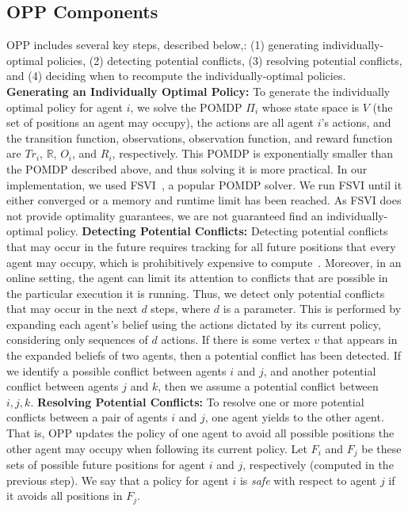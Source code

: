 \documentclass[letterpaper]{article} %
\begin{document}
\subsection{OPP Components}
OPP includes several key steps, described below,:
(1) generating individually-optimal policies,
(2) detecting potential conflicts,
(3) resolving potential conflicts,
and (4) deciding when to recompute the individually-optimal policies.
\noindent\textbf{Generating an Individually Optimal Policy:}
To generate the individually optimal policy for agent $i$, we solve
the POMDP $\Pi_i$ whose state space is $V$ (the set of positions an agent may occupy), the actions are all agent $i$'s actions,
and the transition function, observations, observation function, and reward function are $Tr_i$, $\mathbb{R}$, $O_i$, and $R_i$, respectively.
This POMDP is exponentially smaller than the POMDP described above, and thus solving it is more practical.
In our implementation, we used FSVI~\cite{shani2007forward}, a popular POMDP solver.
We run FSVI until it either converged or a memory and runtime limit has been reached.
As FSVI does not provide optimality guarantees, we are not guaranteed find an individually-optimal policy.
\noindent\textbf{Detecting Potential Conflicts:}
Detecting potential conflicts that may occur in the future requires tracking for all future positions that every agent may occupy, which is prohibitively expensive to compute~\cite{atzmon2020probabilistic}. Moreover, in an online setting, the agent can limit its attention to conflicts that are possible in the particular execution it is running.
Thus, we detect only potential conflicts that may occur in the next $d$ steps, where $d$ is a parameter.
This is performed by expanding each agent's belief using the actions dictated by its current policy, considering only sequences of $d$ actions.
If there is some vertex $v$ that appears in the expanded beliefs of two agents, then a potential conflict has been detected.
If we identify a possible conflict between agents $i$ and $j$, and another potential conflict between agents $j$ and $k$, then we assume a potential conflict between $i,j,k$.
\noindent\textbf{Resolving Potential Conflicts:}
To resolve one or more potential conflicts between a pair of agents $i$ and $j$, one agent yields to the other agent.
That is, OPP updates the policy of one agent to avoid all possible positions the other agent  may occupy when following its current policy.
Let $F_i$ and $F_j$ be these sets of possible future positions for agent $i$ and $j$, respectively (computed in the previous step).
We say that a policy for agent $i$ is \emph{safe} with respect to agent $j$ if it avoids all positions in $F_j$.
\end{document}
